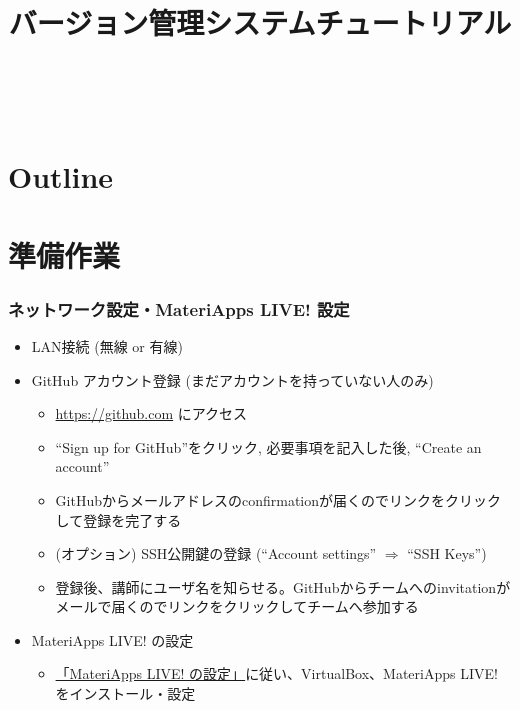 \title{バージョン管理システムチュートリアル}




\begin{frame}
  \titlepage
   \\
\end{frame}

\section*{Outline}
\begin{frame}
  \tableofcontents
\end{frame}

\section{準備作業}

\begin{frame}
  \frametitle{ネットワーク設定・MateriApps LIVE! 設定}
  \begin{itemize}
    \setlength{\itemsep}{1em}
  \item LAN接続 (無線 or 有線)
  \item GitHub アカウント登録 (まだアカウントを持っていない人のみ)
    \begin{itemize}
    \item \url{https://github.com} にアクセス
    \item ``Sign up for GitHub''をクリック, 必要事項を記入した後, ``Create an account''
    \item GitHubからメールアドレスのconfirmationが届くのでリンクをクリックして登録を完了する
    \item (オプション) SSH公開鍵の登録 (``Account settings'' $\Rightarrow$ ``SSH Keys'')
    \item 登録後、講師にユーザ名を知らせる。GitHubからチームへのinvitationがメールで届くのでリンクをクリックしてチームへ参加する
    \end{itemize} 
  \item MateriApps LIVE! の設定
    \begin{itemize}
      \item \href{http://www.slideshare.net/cms_initiative/materiapps-live-52477264}{「MateriApps LIVE! の設定」}に従い、VirtualBox、MateriApps LIVE! をインストール・設定
    \end{itemize}
  \end{itemize}
\end{frame}

